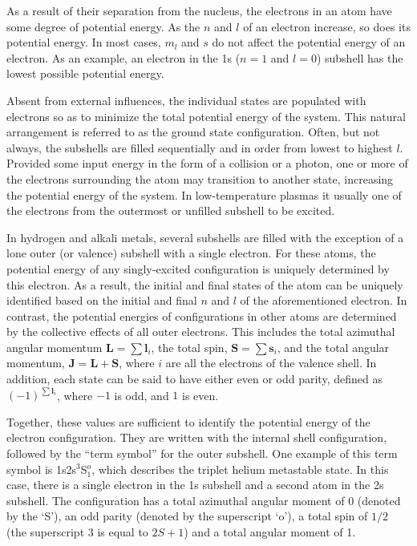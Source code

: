 As a result of their separation from the nucleus, the electrons in an atom have
some degree of potential energy. As the $n$ and $l$ of an electron increase, so
does its potential energy. In most cases, $m_l$ and $s$ do not affect the
potential energy of an electron. As an example, an electron in the 1s ($n=1$ and
$l=0$) subshell has the lowest possible potential energy.

Absent from external influences, the individual states are populated with
electrons so as to minimize the total potential energy of the system. This
natural arrangement is referred to as the ground state configuration. Often, but
not always, the subshells are filled sequentially and in order from lowest to
highest $l$. Provided some input energy in the form of a collision or a photon,
one or more of the electrons surrounding the atom may transition to another
state, increasing the potential energy of the system. In low-temperature plasmas
it usually one of the electrons from the outermost or unfilled subshell to be
excited.

In hydrogen and alkali metals, several subshells are filled with the exception
of a lone outer (or valence) subshell with a single electron. For these atoms,
the potential energy of any singly-excited configuration is uniquely determined
by this electron. As a result, the initial and final states of the atom can be
uniquely identified based on the initial and final $n$ and $l$ of the
aforementioned electron. In contrast, the potential energies of configurations
in other atoms are determined by the collective effects of all outer electrons.
This includes the total azimuthal angular momentum $\bm{L}=\sum \bm{l}_i$, the
total spin, $\bm{S}=\sum \bm{s}_i$, and the total angular momentum,
$\bm{J}=\bm{L}+\bm{S}$, where $i$ are all the electrons of the valence shell. In
addition, each state can be said to have either even or odd parity, defined as
$(-1)^{\sum\bm{l}_i}$, where $-1$ is odd, and $1$ is even.

Together, these values are sufficient to identify the potential energy of the
electron configuration. They are written with the internal shell configuration,
followed by the ``term symbol'' for the outer subshell. One example of this term
symbol is 1s2s$^3$S$^o_{1}$, which describes the triplet helium metastable
state. In this case, there is a single electron in the 1s subshell and a second
atom in the 2s subshell. The configuration has a total azimuthal angular moment
of 0 (denoted by the `S'), an odd parity (denoted by the superscript `o'), a
total spin of $1/2$ (the superscript $3$ is equal to $2S+1$) and a total angular
moment of 1.

